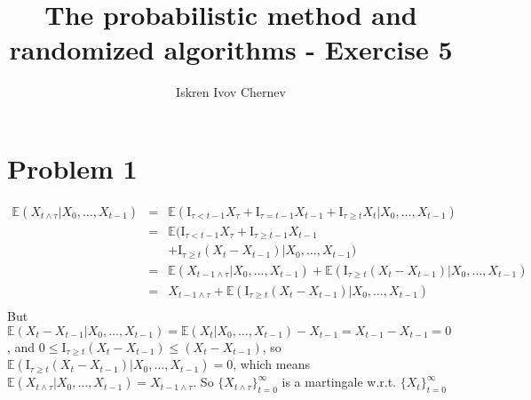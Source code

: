 \documentclass[a4paper]{article}
\begin{document}
\title{The probabilistic method and randomized algorithms - Exercise 5}
\author{Iskren Ivov Chernev}
\maketitle

\def\sm{\mathrm{sm}}
\def\P{\mathbb{P}}
\def\E{\mathbb{E}}
\def\irv{i.r.v.\;}
\def\rv{r.v.\;}
\def\as{a.s.\;}
\def\aas{a.a.s.\;}
\def\FMM{F.M.M.\;}
\def\endproof{$\square$}
\def\Var{\mathrm{Var}}
\def\Cov{\mathrm{Cov}}
\def\CS{\mathrm{CS}}
\def\CCS{\mathrm{CCS}}
\def\Dom{\mathrm{Dom}}
\def\Im{\mathrm{Im}}
\newcommand{\IF}[1] {\mathrm{I}_{#1}}
\newcommand{\bfrac}[2] {\left(\frac{#1}{#2}\right)}
\newcommand{\B}[1] {\left(#1\right)}

\section*{Problem 1}

\begin{eqnarray*}
\E(X_{t \wedge \tau} | X_0, \dots, X_{t-1})
  &=& \E(\IF{\tau < t - 1}X_\tau + \IF{\tau = t - 1}X_{t-1} + \IF{\tau \ge t}X_t|X_0, \dots, X_{t-1})  \\
  &=& \E(\IF{\tau < t - 1}X_\tau + \IF{\tau \ge t - 1}X_{t-1} \\
  && + \IF{\tau \ge t}(X_t - X_{t-1})|X_0, \dots, X_{t-1}) \\
  &=& \E(X_{t-1 \wedge \tau}|X_0, \dots, X_{t-1})
  +   \E(\IF{\tau \ge t}(X_t - X_{t-1}) | X_0, \dots, X_{t-1}) \\
  &=& X_{t-1 \wedge \tau}
  +   \E(\IF{\tau \ge t}(X_t - X_{t-1}) | X_0, \dots, X_{t-1}) \\
\end{eqnarray*}
But $ \E(X_t - X_{t-1} | X_0, \dots, X_{t-1}) = \E(X_t | X_0, \dots, X_{t-1})
- X_{t-1} = X_{t-1} - X_{t-1} = 0 $, and $ 0 \le \IF{\tau \ge t}(X_t - X_{t-1})
\le (X_t - X_{t-1}) $, so $ \E(\IF{\tau \ge t}(X_t - X_{t-1}) | X_0, \dots,
X_{t-1}) = 0 $, which means $ \E(X_{t \wedge \tau} | X_0, \dots, X_{t-1})
= X_{t-1 \wedge \tau} $. So $ \{ X_{t \wedge \tau} \}_{t = 0}^{\infty} $ is
a martingale w.r.t. $ \{X_t\}_{t=0}^{\infty} $
\end{document}
